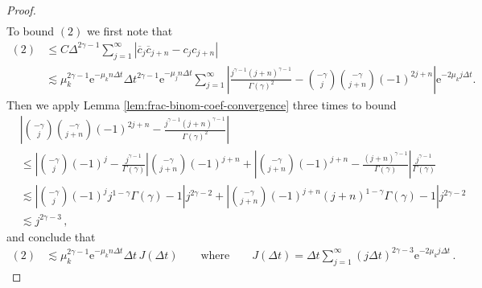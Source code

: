 \documentclass[12pt]{article} %
\newcommand{\abs}[1]{\left| #1 \right|}
\begin{document}
\begin{proof}
\begin{align}
\end{align}
%
To bound $(2)$ we first note that
\begin{align*}
    (2) & \leq C \Delta^{2 \gamma - 1} \sum_{j = 1}^{\infty} \abs{ \overline{c}_j \overline{c}_{j + n} - c_j c_{j + n} } \\
    & \lesssim \mu_k^{2 \gamma - 1} \mathrm{e}^{- \mu_k  n\Delta t } \Delta t^{2 \gamma - 1} \mathrm{e}^{- %
     \mu_j n\Delta t} \sum_{j = 1}^{\infty} \abs{ \frac{j^{\gamma - 1} (j + n)^{\gamma - 1}}{\Gamma(\gamma)^2} - \binom{-\gamma}{j} \binom{-\gamma}{j + n} (-1)^{2j + n}} \mathrm{e}^{-2 \mu_k j \Delta t }.
\end{align*}
Then we apply Lemma \ref{lem:frac-binom-coef-convergence} three times to bound
\begin{align*}
    & \abs{\binom{-\gamma}{j} \binom{-\gamma}{j + n} (-1)^{2j + n} - \frac{j^{\gamma - 1} (j + n)^{\gamma - 1}}{\Gamma(\gamma)^2}} \\
    & \leq \abs{\binom{-\gamma}{j} (-1)^{j} - \frac{j^{\gamma - 1}}{\Gamma(\gamma)}} \binom{-\gamma}{j + n} (-1)^{j + n} + \abs{\binom{-\gamma}{j + n} (-1)^{j + n} - \frac{(j + n)^{\gamma - 1}}{\Gamma(\gamma)}} \frac{j^{\gamma - 1}}{\Gamma(\gamma)} \\
    & \lesssim \abs{\binom{-\gamma}{j} (-1)^{j} j^{1 - \gamma} \Gamma(\gamma) - 1} j^{2 \gamma - 2} + \abs{\binom{-\gamma}{j + n} (-1)^{j + n} (j + n)^{1 - \gamma} \Gamma(\gamma) - 1} j^{2 \gamma - 2} \\
    & \lesssim j^{2 \gamma - 3} \, ,
\end{align*}
and conclude that
\begin{align*}
    (2) 
    & \lesssim  \mu_k^{2 \gamma - 1} \mathrm{e}^{- \mu_k  n\Delta t } \Delta t \,  J(\Delta t) \qquad\text{where}\qquad J(\Delta t)= \Delta t \sum_{j = 1}^{\infty} (j\Delta t)^{2 \gamma - 3} \mathrm{e}^{-2 \mu_k j \Delta t } \, .

\end{align*}
\end{proof}
\end{document}
